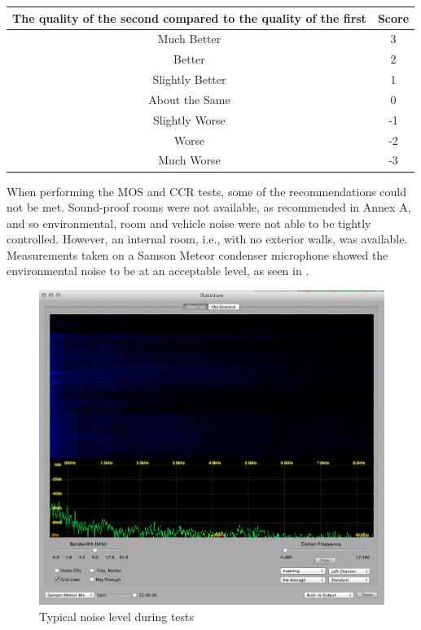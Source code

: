 \begin{table}[h]
{\centering{}%
\begin{minipage}[t]{1\columnwidth}%
\begin{center}
\begin{tabular}{|c|c|}
\hline 
The quality of the second compared to the quality of the first & Score\tabularnewline
\hline 
\hline 
Much Better & 3\tabularnewline
\hline 
Better & 2\tabularnewline
\hline 
Slightly Better & 1\tabularnewline
\hline 
About the Same & 0\tabularnewline
\hline 
Slightly Worse & -1\tabularnewline
\hline 
Worse & -2\tabularnewline
\hline 
Much Worse & -3\tabularnewline
\hline 
\end{tabular}
\par\end{center}%
\end{minipage}}
\end{table}


When performing the \ac{MOS} and \ac{CCR} tests, some of the recommendations
could not be met. Sound-proof rooms were not available, as recommended
in \citep{InternationalTelecommunicationUnion1996} Annex A, and so
environmental, room and vehicle noise were not able to be tightly
controlled. However, an internal room, i.e., with no exterior walls,
was available. Measurements taken on a Samson Meteor condenser microphone
showed the environmental noise to be at an acceptable level, as seen
in .

\begin{figure}
\begin{centering}
\includegraphics[width=1\textwidth]{fig/environment}
\par\end{centering}

\protect\caption{\label{fig:Typical-noise-level}Typical noise level during tests}
\end{figure}


